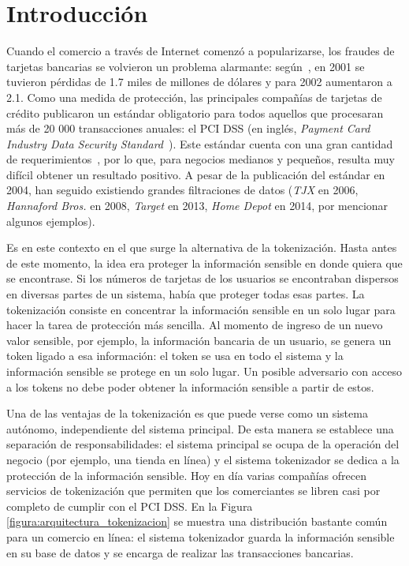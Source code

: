 %
%

\section{Introducción}


Cuando el comercio a través de Internet comenzó a popularizarse, los fraudes de
tarjetas bancarias se volvieron un problema alarmante: según~\cite{wallethub},
en 2001 se tuvieron pérdidas de 1.7 miles de millones de dólares y para 2002
aumentaron a 2.1. Como una medida de protección, las principales compañías de
tarjetas de crédito publicaron un estándar obligatorio para todos aquellos que
procesaran más de 20 000 transacciones anuales: el PCI DSS (en inglés,
\textit{Payment Card Industry Data Security Standard}~\cite{pci_dss}). Este
estándar cuenta con una gran cantidad de requerimientos~\cite{search_security,
uk_association}, por lo que, para negocios medianos y pequeños, resulta
muy difícil obtener un resultado positivo. A pesar de la publicación del
estándar en 2004, han seguido existiendo grandes filtraciones de datos
(\textit{TJX} en 2006, \textit{Hannaford Bros.} en 2008, \textit{Target} en
2013, \textit{Home Depot} en 2014, por mencionar algunos ejemplos).


Es en este contexto en el que surge la alternativa de la tokenización. Hasta
antes de este momento, la idea era proteger la información sensible en donde
quiera que se encontrase. Si los números de tarjetas de los usuarios se
encontraban dispersos en diversas partes de un sistema, había que proteger todas
esas partes. La tokenización consiste en concentrar la información sensible en
un solo lugar para hacer la tarea de protección más sencilla. Al momento de
ingreso de un nuevo valor sensible, por ejemplo, la información bancaria de un
usuario, se genera un token ligado a esa información: el token se usa en todo el
sistema y la información sensible se protege en un solo lugar. Un posible
adversario con acceso a los tokens no debe poder obtener la información sensible
a partir de estos.

Una de las ventajas de la tokenización es que puede verse como un sistema
autónomo, independiente del sistema principal. De esta manera se establece una
separación de responsabilidades: el sistema principal se ocupa de la operación
del negocio (por ejemplo, una tienda en línea) y el sistema tokenizador se
dedica a la protección de la información sensible. Hoy en día varias compañías
ofrecen servicios de tokenización que permiten que los comerciantes se libren
casi por completo de cumplir con el PCI DSS. En la Figura
\ref{figura:arquitectura_tokenizacion} se muestra una distribución bastante
común para un comercio en línea: el sistema tokenizador guarda la información
sensible en su base de datos y se encarga de realizar las transacciones
bancarias.

